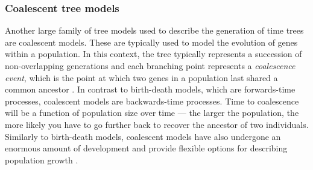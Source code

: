 \subsubsection{Coalescent tree models}
Another large family of tree models used to describe the generation of time trees are coalescent models. These are typically used to model the evolution of genes within a population. 
In this context, the tree typically represents a succession of non-overlapping generations and each branching point represents a \textit{coalescence event}, which is the point at which two genes in a population last shared a common ancestor \citep{Kingman1982}.
In contrast to birth-death models, which are forwards-time processes, coalescent models are backwards-time processes.
Time to coalescence will be a function of population size over time --- the larger the population, the more likely you have to go further back to recover the ancestor of two individuals. %
Similarly to birth-death models, coalescent models have also undergone an enormous amount of development and provide flexible options for describing population growth \citep{Beerli2001, Drummond2005, Mashayekhi2019}. %


